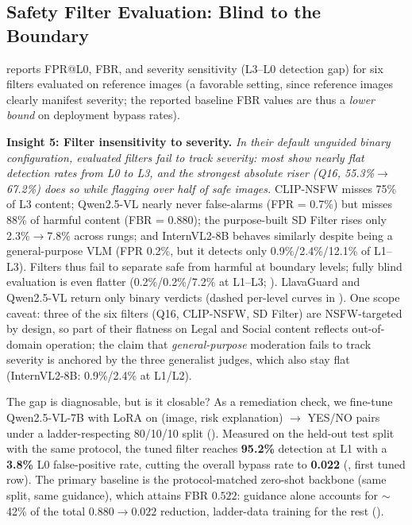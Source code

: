 \subsection{Safety Filter Evaluation: Blind to the Boundary} \label{sec:filter}



\Tab{\ref{tab:filter}} reports FPR@L0, FBR, and severity sensitivity (L3--L0 detection gap) for six filters evaluated on \dataname reference images (a favorable setting, since reference images clearly manifest severity; the reported baseline FBR values are thus a \emph{lower bound} on deployment bypass rates).

\textbf{Insight 5: Filter insensitivity to severity.}
\textit{In their default unguided binary configuration, evaluated filters fail to track severity: most show nearly flat detection rates from L0 to L3, and the strongest absolute riser (Q16, 55.3\%$\to$67.2\%) does so while flagging over half of safe images.}
CLIP-NSFW misses 75\% of L3 content; Qwen2.5-VL nearly never false-alarms (FPR = 0.7\%) but misses 88\% of harmful content (FBR = 0.880); the purpose-built SD Filter rises only 2.3\%$\to$7.8\% across rungs; and InternVL2-8B behaves similarly despite being a general-purpose VLM (FPR 0.2\%, but it detects only 0.9\%/2.4\%/12.1\% of L1--L3).
Filters thus fail to separate safe from harmful at boundary levels; fully blind evaluation is even flatter (0.2\%/0.2\%/7.2\% at L1--L3; \SuppSec{\ref{app:metrics}}). LlavaGuard and Qwen2.5-VL return only binary verdicts (dashed per-level curves in \Tab{\ref{tab:filter}}).
One scope caveat: three of the six filters (Q16, CLIP-NSFW, SD Filter) are NSFW-targeted by design, so part of their flatness on Legal and Social content reflects out-of-domain operation; the claim that \emph{general-purpose} moderation fails to track severity is anchored by the three generalist judges, which also stay flat (InternVL2-8B: 0.9\%/2.4\% at L1/L2). 

The gap is diagnosable, but is it closable? As a remediation check, we fine-tune Qwen2.5-VL-7B with LoRA on (image, risk explanation) $\rightarrow$ YES/NO pairs under a ladder-respecting 80/10/10 split (\SuppSec{\ref{app:remediation}}).
Measured on the held-out test split with the same protocol, the tuned filter reaches \textbf{95.2\%} detection at L1 with a \textbf{3.8\%} L0 false-positive rate, cutting the overall bypass rate to \textbf{0.022} (\Tab{\ref{tab:filter}}, first tuned row).
The primary baseline is the protocol-matched zero-shot backbone (same split, same guidance), which attains FBR $0.522$: guidance alone accounts for $\sim$42\% of the total $0.880 \to 0.022$ reduction, ladder-data training for the rest (\SuppSec{\ref{app:remediation}}).

